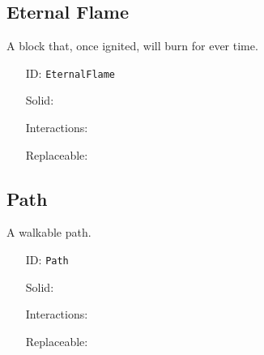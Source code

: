 \subsection{Eternal Flame}\label{subsec:blocks_eternal flame}
A block that, once ignited, will burn for ever time.
\newline
\begin{itemize}[nosep]
    \item[ID:] \texttt{EternalFlame}
    \item[Solid:]  \Checkmark \item[Interactions:]  \XSolidBrush \item[Replaceable:]  \XSolidBrush
\end{itemize}

\subsection{Path}\label{subsec:blocks_path}
A walkable path.
\newline
\begin{itemize}[nosep]
    \item[ID:] \texttt{Path}
    \item[Solid:]  \Checkmark \item[Interactions:]  \XSolidBrush \item[Replaceable:]  \XSolidBrush
\end{itemize}
